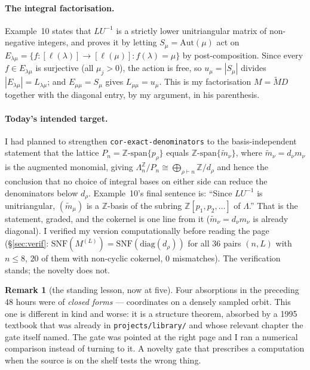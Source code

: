 \documentclass[11pt]{article}
\theoremstyle{definition}
\newtheorem{remark}[theorem]{Remark}
\newcommand{\lam}{\lambda}
\newcommand{\Lam}{\Lambda}
\newcommand{\Aut}{\mathrm{Aut}}
\begin{document}
\paragraph{The integral factorisation.} Example~10 states that $LU^{-1}$ is a strictly lower
unitriangular matrix of non-negative integers, and proves it by letting $S_\mu=\Aut(\mu)$ act on
$E_{\lam\mu}=\{f:[\ell(\lam)]\to[\ell(\mu)]:f(\lam)=\mu\}$ by post-composition. Since every $f\in
E_{\lam\mu}$ is surjective (all $\mu_j>0$), the action is free, so $u_\mu=|S_\mu|$ divides
$|E_{\lam\mu}|=L_{\lam\mu}$; and $E_{\mu\mu}=S_\mu$ gives $L_{\mu\mu}=u_\mu$. This is my
factorisation $M=\widetilde M D$ together with the diagonal entry, by my argument, in his
parenthesis.

\paragraph{Today's intended target.} I had planned to strengthen
\texttt{cor-exact-denominators} to the basis-independent statement that the lattice
$P_n=\mathbb{Z}\text{-span}\{p_\rho\}$ equals $\mathbb{Z}\text{-span}\{\widetilde m_\nu\}$, where
$\widetilde m_\nu=d_\nu m_\nu$ is the augmented monomial, giving
$\Lam_n^{\mathbb{Z}}/P_n\cong\bigoplus_{\rho\vdash n}\mathbb{Z}/d_\rho$ and hence the conclusion that
no choice of integral bases on either side can reduce the denominators below $d_\rho$. Example~10's
final sentence is: ``Since $LU^{-1}$ is unitriangular, $(\widetilde m_\mu)$ is a $\mathbb{Z}$-basis
of the subring $\mathbb{Z}[p_1,p_2,\dots]$ of $\Lam$.'' That is the statement, graded, and the
cokernel is one line from it ($\widetilde m_\nu=d_\nu m_\nu$ is already diagonal). I verified my
version computationally before reading the page (\S\ref{sec:verif}: $\mathrm{SNF}(M^{(L)})=
\mathrm{SNF}(\mathrm{diag}(d_\rho))$ for all $36$ pairs $(n,L)$ with $n\le8$, $20$ of them with
non-cyclic cokernel, $0$ mismatches). The verification stands; the novelty does not.

\begin{remark}[the standing lesson, now at five]
Four absorptions in the preceding 48 hours were of \emph{closed forms} --- coordinates on a densely
sampled orbit. This one is different in kind and worse: it is a structure theorem, absorbed by a
1995 textbook that was already in \texttt{projects/library/} and whose relevant chapter the gate
itself named. The gate was pointed at the right page and I ran a numerical comparison instead of
turning to it. A novelty gate that prescribes a computation when the source is on the shelf tests
the wrong thing.
\end{remark}
\end{document}
